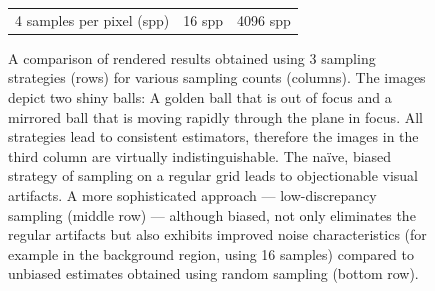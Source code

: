 \begin{figure}
\begin{tabular}{c c c}
   4 samples per pixel (spp)& 16 spp& 4096 spp \\
\end{tabular} 
\label{fig:errorrender}
\caption{A comparison of rendered results obtained using 3 sampling strategies (rows) for various sampling counts (columns). The images depict two shiny balls: A golden ball that is out of focus and a mirrored ball  that is moving rapidly through the plane in focus. All strategies lead to consistent estimators, therefore the images in the third column are virtually indistinguishable. The na\"ive, biased strategy of sampling on a regular grid leads to objectionable visual artifacts. A more sophisticated approach --- low-discrepancy sampling (middle row) --- although biased, not only eliminates the regular artifacts but also exhibits improved noise characteristics (for example in the background region, using 16 samples) compared to unbiased estimates obtained using random sampling (bottom row). }
\end{figure}


